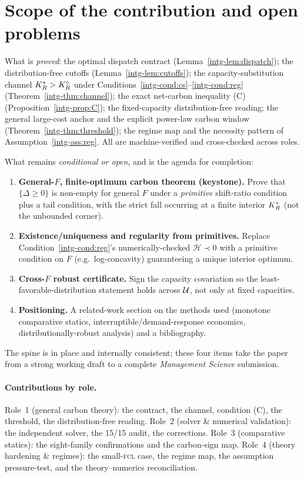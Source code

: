 \section{Scope of the contribution and open problems}\label{intg-sec:open}

What is \emph{proved}: the optimal dispatch contract (Lemma~\ref{intg-lem:dispatch});
the distribution-free cutoffs (Lemma~\ref{intg-lem:cutoffs}); the capacity-substitution
channel $K_R^{*}>K_R^{\circ}$ under Conditions~\ref{intg-cond:cs}--\ref{intg-cond:reg}
(Theorem~\ref{intg-thm:channel}); the exact net-carbon inequality (C)
(Proposition~\ref{intg-prop:C}); the fixed-capacity distribution-free reading; the
general large-cost anchor and the explicit power-law carbon window
(Theorem~\ref{intg-thm:threshold}); the regime map and the necessity pattern of
Assumption~\ref{intg-ass:reg}. All are machine-verified and cross-checked across roles.

What remains \emph{conditional or open}, and is the agenda for completion:
\begin{enumerate}[leftmargin=1.7em,topsep=2pt,itemsep=1.5pt]
  \item \textbf{General-$F$, finite-optimum carbon theorem (keystone).} Prove that
        $\{\Delta\ge0\}$ is non-empty for general $F$ under a \emph{primitive}
        shift-ratio condition plus a tail condition, with the strict fall occurring
        at a finite interior $K_R^{*}$ (not the unbounded corner).
  \item \textbf{Existence/uniqueness and regularity from primitives.} Replace
        Condition~\ref{intg-cond:reg}'s numerically-checked $\mathcal H\prec0$ with a
        primitive condition on $F$ (e.g.\ log-concavity) guaranteeing a unique
        interior optimum.
  \item \textbf{Cross-$F$ robust certificate.} Sign the capacity covariation so
        the least-favorable-distribution statement holds across $\mathcal U$, not only
        at fixed capacities.
  \item \textbf{Positioning.} A related-work section on the methods used (monotone
        comparative statics, interruptible/demand-response economics,
        distributionally-robust analysis) and a bibliography.
\end{enumerate}
The spine is in place and internally consistent; these four items take the paper
from a strong working draft to a complete \emph{Management Science} submission.

\paragraph{Contributions by role.} Role~1 (general carbon theory): the contract,
the channel, condition (C), the threshold, the distribution-free reading. Role~2
(solver \& numerical validation): the independent solver, the 15/15 audit, the
corrections. Role~3 (comparative statics): the eight-family confirmations and the
carbon-sign map. Role~4 (theory hardening \& regimes): the small-\textsc{fcl}
case, the regime map, the assumption pressure-test, and the theory--numerics
reconciliation.
